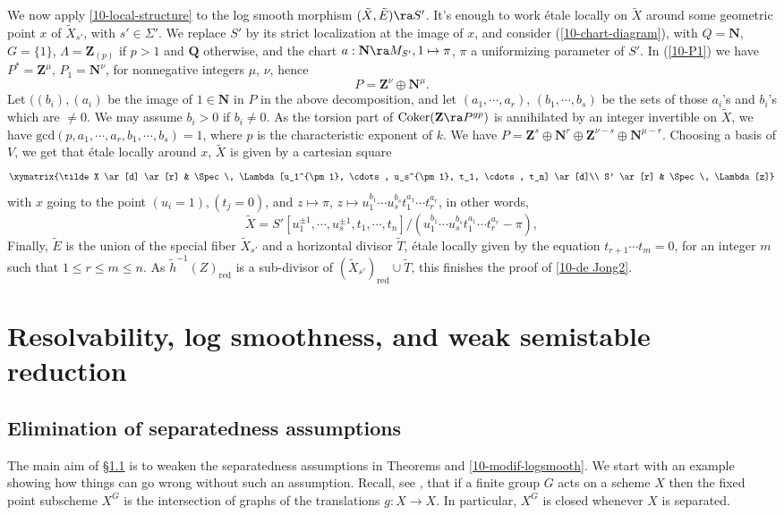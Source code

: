\documentclass[10pt]{../fichiers-configuration-latex/smfart}
\begin{document}
We now apply \ref{10-local-structure} to the log smooth morphism
$(\tilde X, \tilde E) \ra S'$. It's enough to work étale locally on
$\tilde X$ around some geometric point $x$ of $\tilde X_{s'}$, with $s'
\in \Sigma'$. We replace $S'$ by its strict localization at the image
of $x$, and consider (\ref{10-chart-diagram}), with $Q = \mathbf{N}$,
$G = \{1\}$, $\Lambda = \mathbf{Z}_{(p)}$ if $p > 1$ and $\mathbf{Q}$
otherwise, and the chart $a : \mathbf{N} \ra M_{S'}, 1 \mapsto \pi$,
$\pi$ a uniformizing parameter of $S'$. In (\ref{10-P1}) we have $P^*=
\mathbf{Z}^{\mu}$, $P_1 = \mathbf{N}^{\nu}$, for nonnegative integers
$\mu$, $\nu$, hence $$ P = \mathbf{Z}^{\nu} \oplus \mathbf{N}^{\mu}.
$$ Let $((b_i),(a_i)$ be the image of $1 \in \mathbf{N}$ in $P$ in the
above decomposition, and let $(a_1,\cdots,a_r)$, $(b_1,\cdots,b_s)$ be the
sets of those $a_i$'s and $b_i$'s which are $\ne 0$. We may assume $b_i
>0$ if $b_i \ne 0$. As the torsion part of $\mathrm{Coker}(\mathbf{Z}
\ra P^{gp})$ is annihilated by an integer invertible on $\tilde X$, we
have $\mathrm{gcd}(p,a_1,\cdots,a_r,b_1,\cdots,b_s) = 1$, where $p$ is the
characteristic exponent of $k$. We have $P = \mathbf{Z}^s \oplus \mathbf{N}^r
\oplus \mathbf{Z}^{\nu-s} \oplus \mathbf{N}^{\mu - r}$. Choosing a basis of
$V$, we get that étale locally around $x$, $\tilde X$ is given by a cartesian
square $$ \xymatrix{\tilde X \ar[d] \ar[r] & \Spec \, \Lambda[u_1^{\pm 1},
\cdots, u_s^{\pm 1}, t_1, \cdots, t_n] \ar[d]\\ S' \ar[r] & \Spec \, \Lambda[z]}
$$ with $x$ going to the point $(u_i = 1), (t_j = 0)$, and $z \mapsto \pi$,
$z \mapsto u_1^{b_1} \cdots u_s^{b_s}t_1^{a_1}\cdots t_r^{a_r}$, in other
words, $$ \tilde X = S'[u_1^{\pm 1}, \cdots, u_s^{\pm 1}, t_1, \cdots,
t_n]/(u_1^{b_1} \cdots u_s^{b_s}t_1^{a_1} \cdots t_r^{a_r} - \pi), $$ Finally,
$\tilde E$ is the union of the special fiber $\tilde X_{s'}$ and a horizontal
divisor $\tilde T$, étale locally given by the equation $t_{r+1}\cdots
t_m = 0$, for an integer $m$ such that $1 \le r \le m \le n$. As $\tilde
h^{-1}(Z)_{\mathrm{red}}$ is a sub-divisor of $(\tilde X_{s'})_{\mathrm{red}}
\cup \tilde T$, this finishes the proof of \ref{10-de Jong2}.

\section{Resolvability, log smoothness, and weak semistable reduction}\label{10-complsec}

\subsection{Elimination of separatedness assumptions}\label{10-sepelimsec}
The main aim of \S\ref{10-sepelimsec} is to weaken the separatedness assumptions
in Theorems  and \ref{10-modif-logsmooth}.
We start with an example showing how things can go wrong without such an assumption.
Recall, see , that if a finite group $G$ acts on
a scheme $X$ then the fixed point subscheme $X^G$ is the intersection of graphs
of the translations $g{\colon}X\to X$.  In particular, $X^G$ is closed whenever $X$
is separated.
\end{document}

